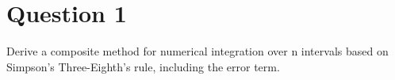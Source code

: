 \section{Question 1}

\begin{question}
    Derive a composite method for numerical integration over n intervals based on Simpson’s Three-Eighth’s rule, including the error term.
\end{question}

\begin{answer}
    
\end{answer}